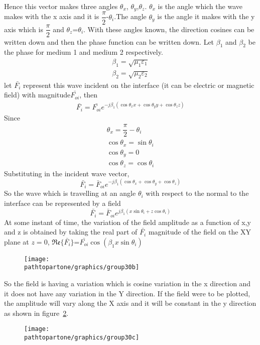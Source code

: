 Hence this vector makes three angles $\theta_x$, $\theta_y$,$\theta_z$. $\theta_x$ is the angle which the wave makes with the x axis and it is $\dfrac{\pi}{2}$-$\theta_i$.The angle $\theta_y$ is the angle it makes with the y axis which is $\dfrac{\pi}{2}$ and $\theta_z$=$\theta_i$. With these angles known, the direction cosines can be written down and then the phase function can be written down. Let $\beta_1$ and $\beta_2$ be the phase for medium 1 and medium 2 respectively.
\begin{align*}
\beta_1=\sqrt{\mu_1\varepsilon_1}\\
\beta_2=\sqrt{\mu_2\varepsilon_2}
\end{align*}
let $\bar{F_i}$ represent this wave incident on the interface (it can be electric or magnetic field) with magnitude$\bar{F_{oi}}$, then
\begin{align*}
\bar{F_{i}}=\bar{F_{oi}}e^{-j\beta_1(\cos\theta_xx +\cos\theta_yy+\cos\theta_zz)}
\end{align*}
Since
\begin{align*}
\theta_x=\dfrac{\pi}{2}-\theta_i\\
\cos\theta _x=\sin \theta_i\\
\cos \theta_y=0\\
\cos\theta_z=\cos \theta_i
\end{align*}
Substituting in the incident wave vector,
$$\bar{F_i}=\bar{F}_{oi}e^{-j\beta_1(\cos \theta_x+\cos \theta_y+\cos \theta_z)}$$
So the wave  which is travelling at an angle $\theta_i$ with respect to the normal to the interface can be represented by a field
$$\bar{F_i}=\bar{F}_{oi}e^{j\beta_1(x\sin \theta_i+z\cos \theta_i)} $$
At some instant of time, the variation of the field amplitude as a function of x,y and z is obtained by taking the real part of $\bar{F_i}$ magnitude of the field on the XY plane at $z=0$, $\mathfrak{Re}\{\bar{F_i}\}$=$\bar{F_{oi}}\cos (\beta_1x\sin \theta_i)$
\begin{figure}[h]
\centering
\texttt{[image: \\pathtopartone/graphics/group30b]}
\caption{}
\label{fig:group30b}
\end{figure}

So the field is having a variation which is cosine variation in the x direction and it does not have any variation in the Y direction. If the field were to be plotted, the amplitude will vary along the X axis and it will be constant in the y direction as shown in figure~\ref{fig:group30c}.
\begin{figure}[h]
\centering
\texttt{[image: \\pathtopartone/graphics/group30c]}
\caption{}
\label{fig:group30c}
\end{figure}

